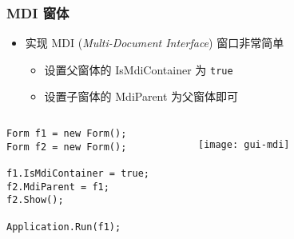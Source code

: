 
\begin{frame}[fragile]
\frametitle{MDI 窗体}
\begin{itemize}
\item 实现 MDI (\textit{Multi-Document Interface}) 窗口非常简单
  \begin{itemize}
  \item 设置父窗体的 IsMdiContainer 为 \texttt{true}
  \item 设置子窗体的 MdiParent 为父窗体即可
  \end{itemize}
\end{itemize}
\begin{columns}
\begin{lstlisting}
Form f1 = new Form();
Form f2 = new Form();

f1.IsMdiContainer = true;
f2.MdiParent = f1;
f2.Show();

Application.Run(f1);
\end{lstlisting}
  \begin{figure}[htbp]
    \centering
    \texttt{[image: gui-mdi]}
  \end{figure}
\end{columns}
\end{frame}

